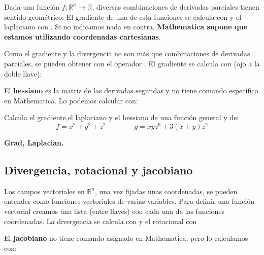 \documentclass[a4paper,10pt, draft]{article}
\newcommand{\com}[1]{\textbf{\color{blue}{#1}}}
\newenvironment{ejer}{\begin{tcolorbox}[center title, title=Ejercicios,
fonttitle=\sffamily\bfseries,colback=blue!5,colframe=orange]}{\end{tcolorbox}}
\newenvironment{funciones}{\begin{tcolorbox}[center title, title=Nuevas funciones, fonttitle=\sffamily\bfseries, colback=green!5!white,colframe=red!75!black]}{\end{tcolorbox}\bigskip}
\begin{document}
Dada una función $f:\mathbb{R}^n \rightarrow \mathbb{R}$, diversas combinaciones de derivadas parciales tienen sentido geométrico. El gradiente de una de esta funciones se calcula con \com{Grad[f,\{$x_1,\dots ,x_n$\}]} y el laplaciano con \com{Laplacian[f,\{$x_1,\dots ,x_n$\}]}. Si no indicamos nada en contra, \textbf{Mathematica supone que estamos utilizando coordenadas cartesianas}.

Como el gradiente y la divergencia no son más que combinaciones de derivadas parciales, se pueden obtener con el operador \com{D}. El gradiente se calcula con (ojo a la doble llave):
\begin{center}
\com{D[f[x,y,z],\{\{x,y,z\}\}]}
\end{center}

El \textbf{hessiano} es la matriz de las derivadas segundas y no tiene comando específico en Mathematica. Lo podemos calcular con:

\begin{center}
\com{D[f[x,y,z],\{\{x,y,z\},2	\}]}
\end{center}

\begin{ejer}

Calcula el gradiente,el laplaciano y el hessiano de una función general y de:
$$
f=x^2 +y^2+z^2 \qquad\qquad g=xyz^6 +3(x+y)z^2
$$

\end{ejer} 

\begin{funciones}

\textbf{Grad, Laplacian.}


\end{funciones}


 \newpage

\subsection{Divergencia, rotacional y jacobiano}

Los campos vectoriales en $\mathbb{R}^n$, una vez fijadas unas coordenadas, se pueden entender como funciones vectoriales de varias variables. Para definir una función vectorial creamos una lista (entre llaves) con cada una de las funciones coordenadas. La divergencia se calcula con \com{Div[\{$f_1,\dots,f_n$\},\{$x_1,\dots ,x_n$\}]} y el rotacional con \com{Curl[\{$f_1,\dots,f_n$\},\{$x_1,\dots ,x_n$\}]}

El \textbf{jacobiano} no tiene comando asignado en Mathematica, pero lo calculamos con:
\end{document}
